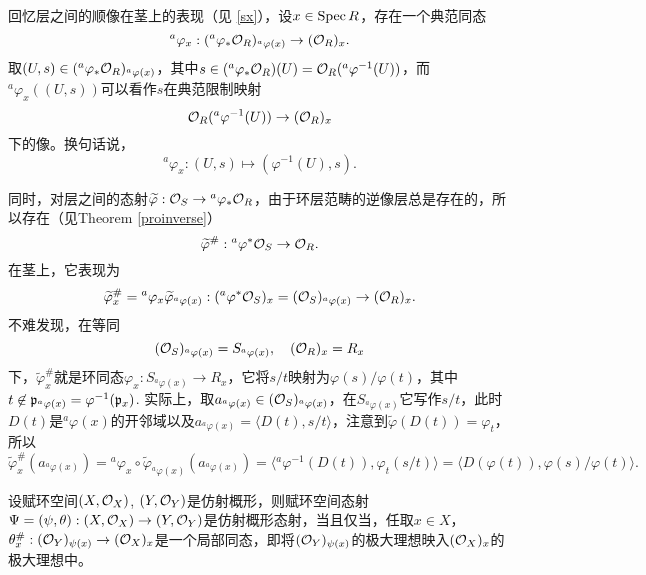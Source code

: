 \begin{para}
回忆层之间的顺像在茎上的表现（见 \ref{sx}），设$x\in \operatorname{Spec} R$，存在一个典范同态
\[
	{}^a\varphi_x:({}^a\varphi_*\mathcal{O}_R)_{{}^a\varphi(x)}\to (\mathcal{O}_R)_{x}.
\]
取$(U,s)\in ({}^a\varphi_*\mathcal{O}_R)_{{}^a\varphi(x)}$，其中$s\in ({}^a\varphi_*\mathcal{O}_R)(U)=\mathcal{O}_R({}^a\varphi^{-1}(U))$，而${}^a\varphi_x((U,s))$可以看作$s$在典范限制映射
\[
	\mathcal{O}_R({}^a\varphi^{-1}(U))\to (\mathcal{O}_R)_x
\]
下的像。换句话说，
\[
	{}^a\varphi_x:(U,s)\mapsto (\varphi^{-1}(U),s).
\]

同时，对层之间的态射$\widetilde{\varphi}:\mathcal{O}_S\to {}^a\varphi_*\mathcal{O}_R$，由于环层范畴的逆像层总是存在的，所以存在（见Theorem \ref{proinverse}）
\[
	\widetilde{\varphi}^\#:{}^a\varphi^*\mathcal{O}_S\to \mathcal{O}_R.
\]
在茎上，它表现为
\[
	\widetilde{\varphi}^\#_x={}^a\varphi_x \widetilde{\varphi}_{{}^a\varphi(x)}:({}^a\varphi^*\mathcal{O}_S)_x=(\mathcal{O}_S)_{{}^a\varphi(x)}\to (\mathcal{O}_R)_x.
\]
不难发现，在等同
\[
	(\mathcal{O}_S)_{{}^a\varphi(x)}=S_{{}^a\varphi(x)},\quad (\mathcal{O}_R)_x=R_x
\]
下，$\widetilde{\varphi}^\#_x$就是环同态$\varphi_x:S_{{}^a\varphi(x)}\to R_x$，它将$s/t$映射为$\varphi(s)/\varphi(t)$，其中$t\not\in \mathfrak{p}_{{}^a\varphi(x)}=\varphi^{-1}(\mathfrak{p}_x)$. 实际上，取$a_{{}^a\varphi(x)}\in (\mathcal{O}_S)_{{}^a\varphi(x)}$，在$S_{{}^a\varphi(x)}$它写作$s/t$，此时$D(t)$是${}^a\varphi(x)$的开邻域以及$a_{{}^a\varphi(x)}=\langle D(t),s/t\rangle$，注意到$\widetilde{\varphi}(D(t))=\varphi_t$，所以
\[
	\widetilde{\varphi}^\#_x(a_{{}^a\varphi(x)})={}^a\varphi_x \circ \widetilde{\varphi}_{{}^a\varphi(x)}(a_{{}^a\varphi(x)})=\langle {}^a\varphi^{-1}(D(t)),\varphi_t(s/t)\rangle =\langle D(\varphi(t)),\varphi(s)/\varphi(t)\rangle.
\]
\end{para}

\begin{pro}
设赋环空间$(X,\mathcal{O}_X)$, $(Y,\mathcal{O}_Y)$是仿射概形，则赋环空间态射$\Psi=(\psi,\theta):(X,\mathcal{O}_X)\to (Y,\mathcal{O}_Y)$是仿射概形态射，当且仅当，任取$x\in X$，$\theta_x^\#:(\mathcal{O}_Y)_{\psi(x)}\to (\mathcal{O}_X)_x$是一个局部同态，即将$(\mathcal{O}_Y)_{\psi(x)}$的极大理想映入$(\mathcal{O}_X)_x$的极大理想中。
\end{pro}

